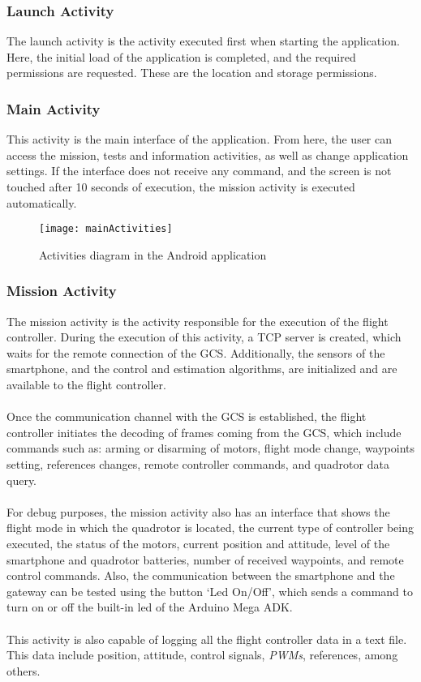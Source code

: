 \subsubsection{Launch Activity}
The launch activity is the activity executed first when starting the application. Here, the initial load of the application is completed, and the required permissions are requested. These are the location and storage permissions.

\subsubsection{Main Activity}
This activity is the main interface of the application. From here, the user can access the mission, tests and information activities, as well as change application settings. If the interface does not receive any command, and the screen is not touched after 10 seconds of execution, the mission activity is executed automatically.

\begin{figure}[H]
\begin{center}
\texttt{[image: mainActivities]}  
\caption{Activities diagram in the Android application} 
\label{fig:mainActivities}
\end{center}
\end{figure}

\subsubsection{Mission Activity}
The mission activity is the activity responsible for the execution of the flight controller. During the execution of this activity, a TCP server is created, which waits for the remote connection of the GCS. Additionally, the sensors of the smartphone, and the control and estimation algorithms, are initialized and are available to the flight controller. 
\\\\
Once the communication channel with the GCS is established, the flight controller initiates the decoding of frames coming from the GCS, which include commands such as: arming or disarming of motors, flight mode change, waypoints setting, references changes, remote controller commands, and quadrotor data query.
\\\\
For debug purposes, the mission activity also has an interface that shows the flight mode in which the quadrotor is located, the current type of controller being executed, the status of the motors, current position and attitude, level of the smartphone and quadrotor batteries, number of received waypoints, and remote control commands. Also, the communication between the smartphone and the gateway can be tested using the button `Led On/Off', which sends a command to turn on or off the built-in led of the Arduino Mega ADK.
\\\\
This activity is also capable of logging all the flight controller data in a text file. This data include position, attitude, control signals, \textit{PWMs}, references, among others.


